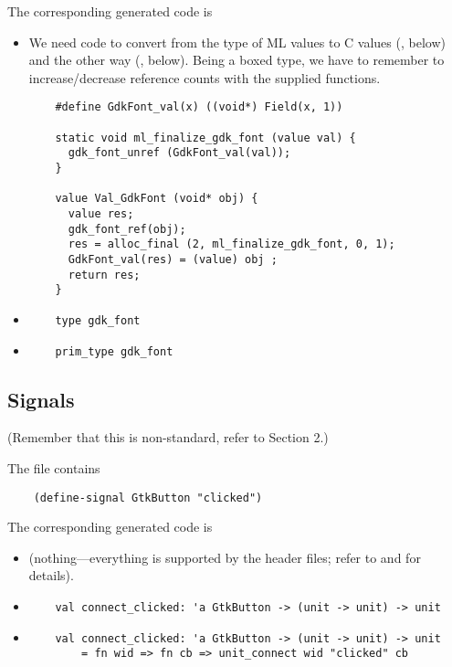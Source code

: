 \documentclass{article}
\begin{document}
The corresponding generated code is
\begin{itemize}
\item {} We need code to convert from the type of ML values
  to C values (, below) and the other way
  (, below). Being a boxed type, we have to
  remember to increase/decrease reference counts with the supplied
  functions.
\begin{verbatim}
    #define GdkFont_val(x) ((void*) Field(x, 1))

    static void ml_finalize_gdk_font (value val) {
      gdk_font_unref (GdkFont_val(val)); 
    }

    value Val_GdkFont (void* obj) {
      value res;
      gdk_font_ref(obj);
      res = alloc_final (2, ml_finalize_gdk_font, 0, 1);
      GdkFont_val(res) = (value) obj ;
      return res;
    }
\end{verbatim}

\item {}
\begin{verbatim}
    type gdk_font
\end{verbatim}

\item {}
\begin{verbatim}
    prim_type gdk_font
\end{verbatim}

\end{itemize}

\subsection{Signals}

(Remember that this is non-standard, refer to Section 2.)

The  file contains
\begin{verbatim}
    (define-signal GtkButton "clicked")
\end{verbatim}


The corresponding generated code is
\begin{itemize}
\item {} (nothing---everything is supported by the header
  files; refer to  and
   for details).

\item {}
\begin{verbatim}
    val connect_clicked: 'a GtkButton -> (unit -> unit) -> unit
\end{verbatim}

\item {}
\begin{verbatim}
    val connect_clicked: 'a GtkButton -> (unit -> unit) -> unit
        = fn wid => fn cb => unit_connect wid "clicked" cb
\end{verbatim}

\end{itemize}
\end{document}
